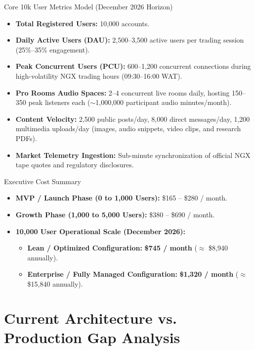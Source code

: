 \documentclass[11pt,a4paper]{article}
\begin{document}
\begin{actionbox}{Core 10k User Metrics Model (December 2026 Horizon)}
\begin{itemize}
    \item \textbf{Total Registered Users:} 10,000 accounts.
    \item \textbf{Daily Active Users (DAU):} 2,500--3,500 active users per trading session (25\%--35\% engagement).
    \item \textbf{Peak Concurrent Users (PCU):} 600--1,200 concurrent connections during high-volatility NGX trading hours (09:30--16:00 WAT).
    \item \textbf{Pro Rooms Audio Spaces:} 2--4 concurrent live rooms daily, hosting 150--350 peak listeners each ($\sim$1,000,000 participant audio minutes/month).
    \item \textbf{Content Velocity:} 2,500 public posts/day, 8,000 direct messages/day, 1,200 multimedia uploads/day (images, audio snippets, video clips, and research PDFs).
    \item \textbf{Market Telemetry Ingestion:} Sub-minute synchronization of official NGX tape quotes and regulatory disclosures.
\end{itemize}
\end{actionbox}

\begin{costbox}{Executive Cost Summary}
\begin{itemize}
    \item \textbf{MVP / Launch Phase (0 to 1,000 Users):} \$165 -- \$280 / month.
    \item \textbf{Growth Phase (1,000 to 5,000 Users):} \$380 -- \$690 / month.
    \item \textbf{10,000 User Operational Scale (December 2026):}
    \begin{itemize}
        \item \textbf{Lean / Optimized Configuration:} \textbf{\$745 / month} ($\approx$ \$8,940 annually).
        \item \textbf{Enterprise / Fully Managed Configuration:} \textbf{\$1,320 / month} ($\approx$ \$15,840 annually).
    \end{itemize}
\end{itemize}
\end{costbox}

\section{Current Architecture vs. Production Gap Analysis}
\end{document}
